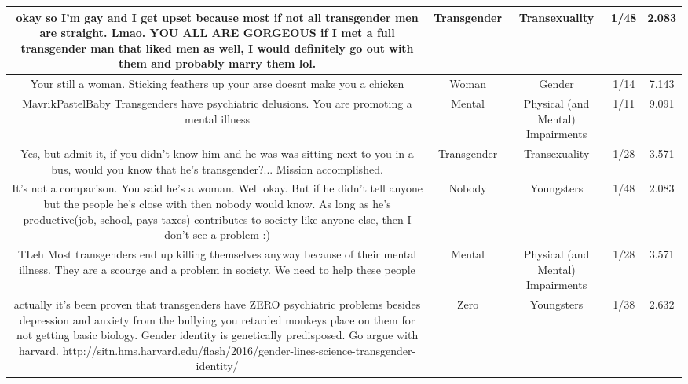 \documentclass[11pt]{article}
\newlength\mylength
\begin{document}
\begin{center}
\begin{longtable}{|C{.40\mylength}|C{.30\mylength}|C{.15\mylength}|C{.15\mylength}|C{.15\mylength}|}
      okay so I'm gay and I get upset because most if not all transgender men are straight. Lmao. YOU ALL ARE GORGEOUS        if I met a full transgender man that liked men as well, I would definitely go out with them and probably marry them lol.  & Transgender & Transexuality & 1/48 & 2.083 \\  \hline
  Your still a woman. Sticking feathers up your arse doesnt make you a chicken  & Woman & Gender & 1/14 & 7.143 \\  \hline
   MavrikPastelBaby   Transgenders have psychiatric delusions. You are promoting a mental illness  & Mental & Physical (and Mental) Impairments & 1/11 & 9.091 \\  \hline
  Yes, but admit it, if you didn't know him and he was was sitting next to you in a bus, would you know that he's transgender?... Mission accomplished.  & Transgender & Transexuality & 1/28 & 3.571 \\  \hline
  It's not a comparison. You said he's a woman. Well okay. But if he didn't tell anyone but the people he's close with then nobody would know. As long as he's productive(job, school, pays taxes) contributes to society like anyone else,  then I don't see a problem :)  & Nobody & Youngsters & 1/48 & 2.083 \\  \hline
   TLeh  Most transgenders end up killing themselves anyway because of their mental illness. They are a scourge and a problem in society. We need to help these people  & Mental & Physical (and Mental) Impairments & 1/28 & 3.571 \\  \hline
  actually it's been proven that transgenders have ZERO psychiatric problems besides depression and anxiety from the bullying you retarded monkeys place on them for not getting basic biology. Gender identity is genetically predisposed. Go argue with harvard. http://sitn.hms.harvard.edu/flash/2016/gender-lines-science-transgender-identity/  & Zero & Youngsters & 1/38 & 2.632 \\  \hline

\end{longtable}
\end{center}
\end{document}

